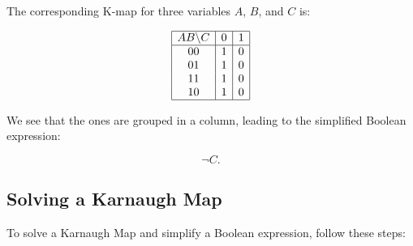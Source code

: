 The corresponding K-map for three variables \(A\), \(B\), and \(C\) is:

\[
	\begin{array}{|c|c|c|c|}
		\hline
		AB \backslash C & 0 & 1 \\
		\hline
		00              & 1 & 0 \\
		01              & 1 & 0 \\
		11              & 1 & 0 \\
		10              & 1 & 0 \\
		\hline
	\end{array}
\]

We see that the ones are grouped in a column, leading to the simplified Boolean expression:

\[
	\neg C.
\]

\subsection{Solving a Karnaugh Map}

To solve a Karnaugh Map and simplify a Boolean expression, follow these steps:

